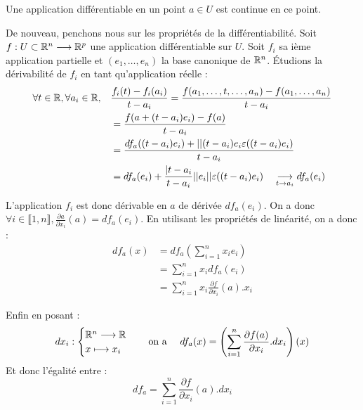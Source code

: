 \begin{theorem}[Continuité]
    Une application différentiable en un point $a \in U$ est continue en ce point. 
\end{theorem}

De nouveau, penchons nous sur les propriétés de la différentiabilité. 
Soit $f : U \subset \mathbb{R}^n \longrightarrow \mathbb{R}^p$ une application différentiable sur $U$. 
Soit $f_i$ sa ième application partielle et $(e_1, \dots, e_n)$ la base canonique de $\mathbb{R}^n$. 
Étudions la dérivabilité de $f_i$ en tant qu'application réelle : 
\begin{align*}
    \forall t \in \mathbb{R}, \forall a_i \in \mathbb{R}, \quad & \frac{f_i(t) - f_i(a_i)}{t - a_i} = \frac{f(a_1, \dots, t, \dots, a_n) - f(a_1, \dots, a_n)}{t - a_i} \\ 
    & = \frac{f(a + (t - a_i)e_i) -f(a)}{t - a_i} \\ 
    & = \frac{df_a((t - a_i)e_i) + ||(t - a_i)e_i \varepsilon((t-a_i)e_i)}{t - a_i} \\ 
    & = df_a(e_i) + \frac{| t - a_i}{t - a_i} ||e_i|| \varepsilon ((t-a_i)e_i) \quad \underset{t \to a_i}{\longrightarrow} df_a(e_i)
\end{align*}

L'application $f_i$ est donc dérivable en $a$ de dérivée $df_a(e_i)$. 
On a donc $ \forall i \in \llbracket 1, n \rrbracket, \frac{\partial a}{\partial x_i}(a) = df_a(e_i)$. 
En utilisant les propriétés de linéarité, on a donc : 
\begin{align*}
    df_a(x) &= df_a \left( \sum_{i=1}^{n} x_i e_i\right) \\ 
    &= \sum_{i=1}^{n} x_i df_a(e_i) \\ 
    &= \sum_{i=1}^{n} x_i \frac{\partial f}{\partial x_i} (a) . x_i 
\end{align*}

Enfin en posant : 
    \[ dx_i : 
        \begin{cases}
            \mathbb{R}^n \longrightarrow \mathbb{R} \\ 
            x \longmapsto x_i
        \end{cases} 
        \quad \text{on a } \quad 
        df_a(x) = \left(\sum_{i=1}^{n} \frac{\partial f(a)}{\partial x_i} . dx_i\right) (x)
        \] 
Et donc l'égalité entre : 
    \[ df_a = \sum_{i=1}^{n} \frac{\partial f}{\partial x_i} (a) . dx_i \] 

